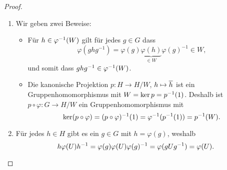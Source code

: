\begin{proof}
  \leavevmode
  \begin{enumerate}[label=\arabic*)]
    \item
      Wir geben zwei Beweise:
      \begin{itemize}
        \item
          Für $h \in \varphi^{-1}(W)$ gilt für jedes $g \in G$ dass
          \[
                \varphi( g h g^{-1} )
            =   \varphi(g) \underbrace{\varphi(h)}_{\in W} \varphi(g)^{-1}
            \in W,
          \]
          und somit dass $g h g^{-1} \in \varphi^{-1}(W)$.
        \item
          Die kanonische Projektion $p \colon H \to H/W$, $h \mapsto \overline{h}$ ist ein Gruppenhomomorphismus mit $W = \ker p = p^{-1}(1)$.
          Deshalb ist $p \circ \varphi \colon G \to H/W$ ein Gruppenhomomorphismus mit
          \[
              \ker (p \circ \varphi)
            = (p \circ \varphi)^{-1}(1)
            = \varphi^{-1}(p^{-1}(1))
            = p^{-1}(W).
          \]
      \end{itemize}
    \item
      Für jedes $h \in H$ gibt es ein $g \in G$ mit $h = \varphi(g)$, weshalb
      \[
          h \varphi(U) h^{-1}
        = \varphi(g) \varphi(U) \varphi(g)^{-1}
        = \varphi( g U g^{-1} )
        = \varphi(U).
        \qedhere
      \]
  \end{enumerate}
\end{proof}

